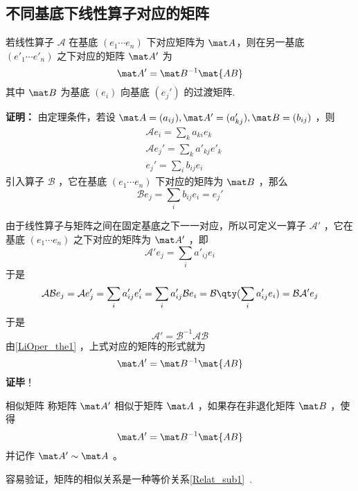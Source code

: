 \subsection{不同基底下线性算子对应的矩阵}\label{LiOper_sub1}
\begin{theorem}{}\label{LiOper_the2}
若线性算子 $\mathcal A$ 在基底 $( e_1\cdots  e_n)$ 下对应矩阵为 $\mat A$，则在另一基底  $( e'_1\cdots  e'_n)$ 之下对应的矩阵 $\mat A'$ 为
\begin{equation}
\mat A'=\mat B^{-1}\mat{AB}
\end{equation}
其中 $\mat B$ 为基底 $( e_i)$ 向基底 $( e_j')$ 的过渡矩阵.
\end{theorem}
\textbf{证明：}
由定理条件，若设 $\mat A=(a_{ij}), \mat A'=(a_{kj}'),\mat B=(b_{ij})$ ，则
\begin{equation}
\begin{aligned}
&\mathcal{A} e_i=\sum_{k} a_{ki} e_k
\\
&\mathcal{A} e_j'=\sum_{k} a'_{kj} e'_k\\
& e_j'=\sum_i b_{ij} e_i
\end{aligned}
\end{equation}
引入算子 $\mathcal{B}$ ，它在基底 $( e_1\cdots  e_n)$ 下对应的矩阵为 $\mat B$ ，那么
\begin{equation}
\mathcal{B} e_j=\sum_i b_{ij} e_i= e_j'
\end{equation}

由于线性算子与矩阵之间在固定基底之下一一对应，所以可定义一算子 $\mathcal{A'}$ ，它在基底 $( e_1\cdots  e_n)$ 之下对应的矩阵为 $\mat A'$ ，即
\begin{equation}
\mathcal A' e_j=\sum_i a'_{ij} e_i
\end{equation}
于是
\begin{equation}
\mathcal{AB} e_j=\mathcal{A} e'_j=\sum_i a'_{ij}  e'_i=\sum_i a'_{ij}\mathcal{B} e_i=\mathcal{B}\qty(\sum_i a'_{ij} e_i)=\mathcal{BA'} e_j
\end{equation}
于是 
\begin{equation}
\mathcal{A'}=\mathcal{B}^{-1}\mathcal{AB}
\end{equation}
由\autoref{LiOper_the1} ，上式对应的矩阵的形式就为
\begin{equation}
\mat A'=\mat B^{-1}\mat{AB}
\end{equation}
\textbf{证毕}！
\begin{definition}{相似矩阵}
称矩阵 $\mat A'$ 相似于矩阵 $\mat A$ ，如果存在非退化矩阵 $\mat B$ ，使得
\begin{equation}
\mat A'=\mat B^{-1}\mat{AB}
\end{equation}
并记作 $\mat A'\sim \mat A$ 。
\end{definition}
容易验证，矩阵的相似关系是一种等价关系\autoref{Relat_sub1}~.

